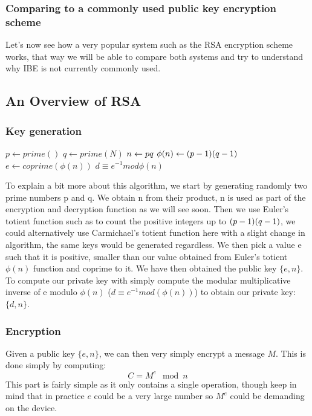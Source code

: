 \documentclass[conference]{IEEEtran}
\begin{document}
\subsubsection{Comparing to a commonly used public key encryption scheme}
Let's now see how a very popular system such as the RSA encryption scheme works, 
that way we will be able to compare both systems and try to understand why 
IBE is not currently commonly used.


\subsection{An Overview of RSA}
\subsubsection{Key generation}

\begin{algorithmic}
\STATE $p \leftarrow prime()$
\STATE $q \leftarrow prime(N)$
\STATE $n \leftarrow p \* q$
\STATE $\phi (n) \leftarrow (p - 1) \* (q - 1)$
\STATE $e \leftarrow coprime(\phi (n))$
\STATE $d \equiv e^{-1} mod \phi(n)$
\end{algorithmic}
To explain a bit more about this algorithm, we start by generating randomly two prime numbers
p and q. We obtain n from their product, n is used as part of the encryption and decryption function
as we will see soon. Then we use Euler's totient function such as to count the positive integers
up to $(p - 1) \* (q - 1)$, we could alternatively use Carmichael's totient function here 
with a slight change in algorithm, the same keys would be generated regardless. We then pick a value e
such that it is positive, smaller than our value obtained from Euler's totient $\phi(n) $ function and coprime to it.
We have then obtained the public key $\{e,n\}$. To compute our private key with simply compute 
the modular multiplicative inverse of e modulo $\phi(n)$ ($d \equiv e^{-1} mod(\phi(n))$) to obtain
our private key: $\{d,n\}$.

\subsubsection{Encryption}
Given a public key $\{e,n\}$, we can then very simply encrypt a message $M$.
This is done simply by computing:
\begin{equation*}
    C = M^{e}\mod n
\end{equation*}
This part is fairly simple as it only contains a single operation, though keep in mind that
in practice $e$ could be a very large number so $M^{e}$ could be demanding on the device.
\end{document}
